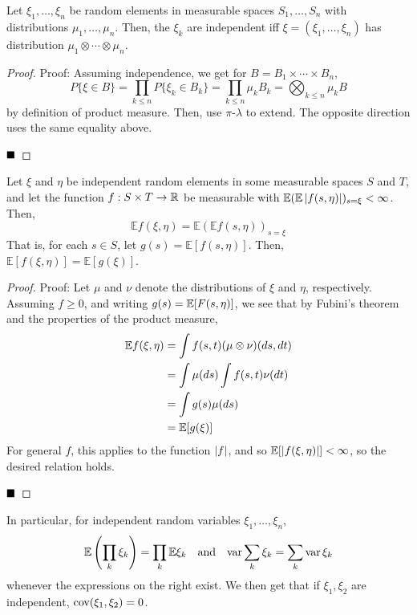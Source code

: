 \begin{lemma}
    Let $\xi_1, \ldots, \xi_n$ be random elements in measurable spaces $S_1, \ldots, S_n$ with distributions $\mu_1, \ldots, \mu_n$. Then, the $\xi_k$ are independent iff $\xi = (\xi_1, \ldots, \xi_n)$ has distribution $\mu_1 \otimes \cdots \otimes \mu_n$.
\end{lemma}
\begin{proof}{Proof:}
    Assuming independence, we get for $B = B_1 \times \cdots \times B_n$,
    \[ P\{\xi \in B\} = \prod_{k \leq n} P\{\xi_k \in B_k\} = \prod_{k \leq n} \mu_kB_k = \bigotimes_{k \leq n} \mu_kB \]
    by definition of product measure. Then, use $\pi$-$\lambda$ to extend. The opposite direction uses the same equality above. 


    $\qed$
\end{proof}

\begin{lemma}
    Let $\xi$ and $\eta$ be independent random elements in some measurable spaces $S$ and $T$, and let the function $f : S \times T \to \R$ be measurable with $\mathbb{E}(\mathbb{E}\abs{f(s, \eta)})_{s = \xi} < \infty$. Then,
    \[ \mathbb{E}f(\xi, \eta) = \mathbb{E}(\mathbb{E}f(s, \eta))_{s = \xi} \]
    That is, for each $s \in S$, let $g(s) = \mathbb{E}[f(s, \eta)]$. Then, $\mathbb{E}[f(\xi, \eta)] = \mathbb{E}[g(\xi)]$.
\end{lemma}
\begin{proof}{Proof:}
    Let $\mu$ and $\nu$ denote the distributions of $\xi$ and $\eta$, respectively. Assuming $f \geq 0$, and writing $g(s) = \bb{E}[F(s, \eta)]$, we see that by Fubini's theorem and the properties of the product measure,
    \begin{align*}
        \bb{E} f(\xi, \eta) &= \int f(s, t)(\mu \otimes \nu)(ds, dt)\\
        &= \int \mu(ds) \int f(s, t)\nu(dt)\\
        &= \int g(s) \mu(ds)\\
        &= \bb{E}[g(\xi)]
    \end{align*}
    For general $f$, this applies to the function $\abs{f}$, and so $\bb{E}[\abs{f(\xi, \eta)}] < \infty$, so the desired relation holds.

    $\qed$
\end{proof}

In particular, for independent random variables $\xi_1, \ldots, \xi_n$,
\[ \mathbb{E}\left(\prod_{k} \xi_k\right) = \prod_{k} \mathbb{E}\xi_k \quad \tt{and} \quad \tt{var}\sum_{k} \xi_k = \sum_{k} \tt{var}\,\xi_k \]
whenever the expressions on the right exist. We then get that if $\xi_1, \xi_2$ are independent, $\tt{cov}(\xi_1, \xi_2) = 0$.

